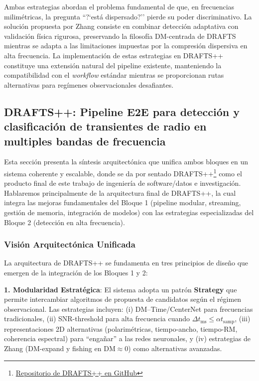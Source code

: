 Ambas estrategias abordan el problema fundamental de que, en frecuencias milimétricas, la pregunta ``?`está dispersado?'' pierde su poder discriminativo. La solución propuesta por Zhang consiste en combinar detección adaptativa con validación física rigurosa, preservando la filosofía DM-centrada de DRAFTS mientras se adapta a las limitaciones impuestas por la compresión dispersiva en alta frecuencia. La implementación de estas estrategias en DRAFTS++ constituye una extensión natural del pipeline existente, manteniendo la compatibilidad con el \textit{workflow} estándar mientras se proporcionan rutas alternativas para regímenes observacionales desafiantes.

\subsection{DRAFTS++: Pipeline E2E para detección y clasificación de transientes de radio en multiples bandas de frecuencia}

Esta sección presenta la síntesis arquitectónica que unifica ambos bloques en un sistema coherente y escalable, donde se da por sentado DRAFTS++\footnote{\href{https://github.com/Kodamonkey/DRAFTS-UC}{Repositorio de DRAFTS++ en GitHub}} como el producto final de este trabajo de ingeniería de software/datos e investigación. Hablaremos principalmente de la arquitectura final de DRAFTS++, la cual integra las mejoras fundamentales del Bloque 1 (pipeline modular, streaming, gestión de memoria, integración de modelos) con las estrategias especializadas del Bloque 2 (detección en alta frecuencia).

\subsubsection{Visión Arquitectónica Unificada}

La arquitectura de DRAFTS++ se fundamenta en tres principios de diseño que emergen de la integración de los Bloques 1 y 2:

\textbf{1. Modularidad Estratégica}: El sistema adopta un patrón \textbf{Strategy} que permite intercambiar algoritmos de propuesta de candidatos según el régimen observacional. Las estrategias incluyen: (i) DM--Time/CenterNet para frecuencias tradicionales, (ii) SNR-threshold para alta frecuencia cuando $\Delta t_{\mathrm{ms}} \leq \alpha t_{\mathrm{samp}}$, (iii) representaciones 2D alternativas (polarimétricas, tiempo-ancho, tiempo-RM, coherencia espectral) para ``engañar'' a las redes neuronales, y (iv) estrategias de Zhang (DM-expand y fishing en DM$\approx0$) como alternativas avanzadas.

